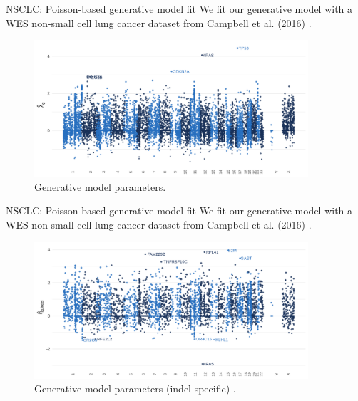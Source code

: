\documentclass{beamer}
\begin{document}
\begin{frame}{NSCLC: Poisson-based generative model fit}
We fit our generative model with a WES non-small cell lung cancer dataset from Campbell et al. (2016) \citep{campbell_distinct_2016}.
\begin{figure}[htbp]
\centering
\includegraphics[width=4in]{figures/fig4.png}
\caption{Generative model parameters. \citep{bradley_data-driven_2021}\label{fig:3}}
\end{figure}
\end{frame}

\begin{frame}{NSCLC: Poisson-based generative model fit}
We fit our generative model with a WES non-small cell lung cancer dataset from Campbell et al. (2016) \citep{campbell_distinct_2016}.
\begin{figure}[htbp]
\centering
\includegraphics[width=4in]{figures/fig5.png}
\caption{Generative model parameters (indel-specific) \citep{bradley_data-driven_2021}. \label{fig:3}}
\end{figure}
    
\end{frame}
\end{document}
